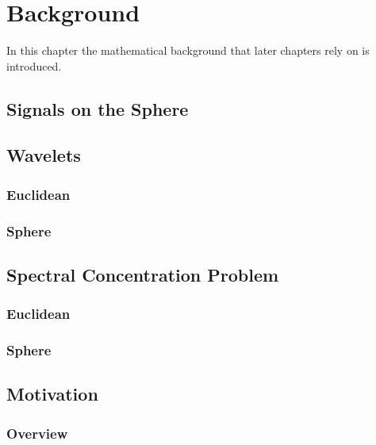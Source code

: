 \chapter{Background}\label{sec:chapter2}

In this chapter the mathematical background that later chapters rely on is introduced.

\section{Signals on the Sphere}



\section{Wavelets}

\subsection{Euclidean}

\subsection{Sphere}

\section{Spectral Concentration Problem}

\subsection{Euclidean}

\subsection{Sphere}





\section{Motivation}

\subsection{Overview}

